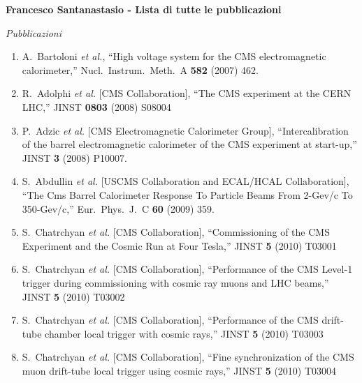 \documentclass[10pt]{letter}
\begin{document}
{\large \sc \bf Francesco Santanastasio - Lista di tutte le pubblicazioni}

\begin{center} \textit{Pubblicazioni} \end{center}

\begin{enumerate}

\item A.~Bartoloni {\it et al.},
  ``High voltage system for the CMS electromagnetic calorimeter,''
  Nucl.\ Instrum.\ Meth.\  A {\bf 582} (2007) 462.

\item R.~Adolphi {\it et al.}  [CMS Collaboration],
  ``The CMS experiment at the CERN LHC,''
  JINST {\bf 0803} (2008) S08004

\item P.~Adzic {\it et al.}  [CMS Electromagnetic Calorimeter Group],
  ``Intercalibration of the barrel electromagnetic calorimeter of the CMS
  experiment at start-up,'' JINST {\bf 3} (2008) P10007.

\item S.~Abdullin {\it et al.}  [USCMS Collaboration and ECAL/HCAL Collaboration],
  ``The Cms Barrel Calorimeter Response To Particle Beams From 2-Gev/c To 350-Gev/c,''
  Eur.\ Phys.\ J.\  C {\bf 60} (2009) 359.

\item S.~Chatrchyan {\it et al.}  [CMS Collaboration],
  ``Commissioning of the CMS Experiment and the Cosmic Run at Four Tesla,''
  JINST {\bf 5} (2010) T03001

\item S.~Chatrchyan {\it et al.}  [CMS Collaboration],
  ``Performance of the CMS Level-1 trigger during commissioning with cosmic ray muons and LHC beams,''
  JINST {\bf 5} (2010) T03002

\item S.~Chatrchyan {\it et al.}  [CMS Collaboration],
  ``Performance of the CMS drift-tube chamber local trigger with cosmic rays,''
  JINST {\bf 5} (2010) T03003

\item S.~Chatrchyan {\it et al.}  [CMS Collaboration],
  ``Fine synchronization of the CMS muon drift-tube local trigger using cosmic rays,''
  JINST {\bf 5} (2010) T03004


\end{enumerate}
\end{document}
